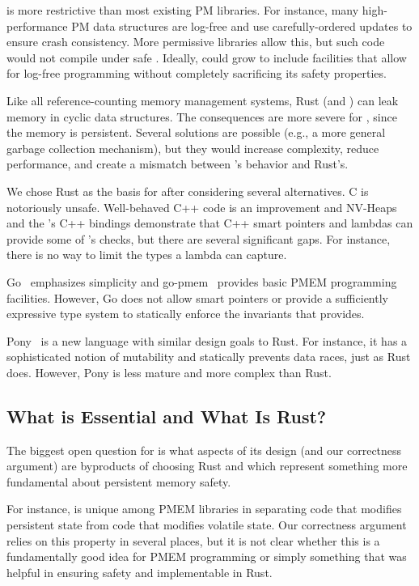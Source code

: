  \This{} is more restrictive than most
existing PM libraries.  For instance, many high-performance PM data structures
are log-free and use carefully-ordered updates to ensure crash consistency.
More permissive libraries allow this, but such code would not compile under
safe \this{}.  Ideally, \this{} could grow to include
 facilities that allow for log-free programming without completely
sacrificing its safety properties.

 Like all reference-counting memory management systems, Rust (and \this{}) can leak memory in cyclic data structures.  The consequences are more severe for \this{}, since the memory is persistent.  Several solutions are possible (e.g., a more general garbage collection mechanism), but they would increase complexity, reduce performance, and create a mismatch between \this{}'s behavior and Rust's.

 We chose Rust as the basis for \this{} after
considering several alternatives.  C is notoriously unsafe.  Well-behaved C++
code is an improvement and NV-Heaps and the 's C++ bindings
demonstrate that C++ smart pointers and lambdas can provide some of \this{}'s
checks, but there are several significant gaps.  For instance, there is no way
to limit the types a lambda can capture.

Go~\cite{golang} emphasizes simplicity and go-pmem~\cite{gopmem} provides basic
PMEM programming facilities.  However, Go does not allow smart pointers or
provide a sufficiently expressive type system to statically enforce the
invariants that \this{} provides.

Pony~\cite{pony} is a new language with similar design goals to Rust.  For
instance, it has a sophisticated notion of mutability and statically prevents
data races, just as Rust does.  However, Pony is less mature and more complex
than Rust.

\subsection{What is Essential and What Is Rust?}

The biggest open question for \this{} is what aspects of its design (and our
correctness argument) are byproducts of choosing Rust and which represent
something more fundamental about persistent memory safety.

For instance, \this{} is unique among PMEM libraries in separating code that
modifies persistent state from code that modifies volatile state.  Our
correctness argument relies on this property in several places, but it is not
clear whether this is a fundamentally good idea for PMEM programming or simply
something that was helpful in ensuring safety and implementable in Rust.

